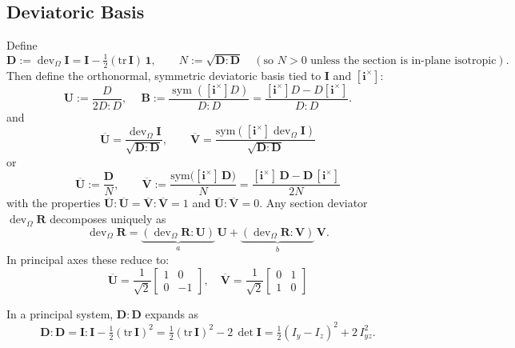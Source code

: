 
\subsection{Deviatoric Basis}\label{deviatoric-basis}

Define 
\[
\mathbf{D}:=\operatorname{dev}_{\Omega}\mathbf{I}=\mathbf{I}-\tfrac12(\mathrm{tr}\,\mathbf{I})\,\mathbf{1},\qquad
N:=\sqrt{\mathbf{D}\!:\!\mathbf{D}}\quad(\text{so }N>0\text{ unless the section is in-plane isotropic}).
\] 
Then define the orthonormal, symmetric deviatoric basis tied to \(\mathbf{I}\) and
\([\mathbf{i}^{\times}]\): 
$$
\mathbf{U}:=\frac{D}{2 D:D}, \quad \mathbf{~B}:=\frac{\operatorname{sym}\left(\left[\mathbf{i}^{\times}\right] D\right)}{D: D}=\frac{\left[\mathbf{i}^{\times}\right] D-D\left[\mathbf{i}^{\times}\right]}{D: D} .
$$
and
\[
\overline{\mathbf{U}}=\frac{\operatorname{dev}_{\Omega}\mathbf{I}}{\sqrt{\mathbf{D}\!:\!\mathbf{D}}},\qquad
\overline{\mathbf{V}}=\frac{\mathrm{sym}([\mathbf{i}^{\times}]\operatorname{dev}_{\Omega}\mathbf{I})}{\sqrt{\mathbf{D}\!:\!\mathbf{D}}}
\]
or
\[
\overline{\mathbf{U}}:=\frac{\mathbf{D}}{N},\qquad
\overline{\mathbf{V}}:=\frac{\mathrm{sym}\big([\mathbf{i}^{\times}]\,\mathbf{D}\big)}{N}
=\frac{[\mathbf{i}^{\times}]\,\mathbf{D}-\mathbf{D}\,[\mathbf{i}^{\times}]}{2N}
\]
with the properties 
\(\overline{\mathbf{U}}\!:\!\overline{\mathbf{U}}=\overline{\mathbf{V}}\!:\!\overline{\mathbf{V}}=1\)
and \(\overline{\mathbf{U}}\!:\!\overline{\mathbf{V}}=0\). 
Any section deviator \(\operatorname{dev}_{\Omega}\bm{R}\) decomposes uniquely as
\[
\operatorname{dev}_{\Omega}\bm{R}=\underbrace{(\operatorname{dev}_{\Omega}\bm{R}:{\mathbf{U}})}_{a}\,{\mathbf{U}}
+\underbrace{(\operatorname{dev}_{\Omega}\bm{R}:{\mathbf{V}})}_{b}\,{\mathbf{V}}.
\]
In
principal axes these reduce to:
\begin{equation}
\overline{\mathbf{U}}=\frac{1}{\sqrt{2}}\left[\begin{array}{cc}
1 & 0 \\
0 & -1
\end{array}\right], \quad \overline{\mathbf{V}}=\frac{1}{\sqrt{2}}\left[\begin{array}{ll}
0 & 1 \\
1 & 0
\end{array}\right]
\end{equation}


In a principal system, \(\mathbf{D}\!:\!\mathbf{D}\) expands as \[
\mathbf{D}\!:\!\mathbf{D}
=\mathbf{I}\!:\!\mathbf{I}-\tfrac12(\mathrm{tr}\,\mathbf{I})^2
=\tfrac12(\mathrm{tr}\,\mathbf{I})^2-2\,\det\mathbf{I}
=\tfrac12(I_y-I_z)^2+2\,I_{yz}^2.
\]

